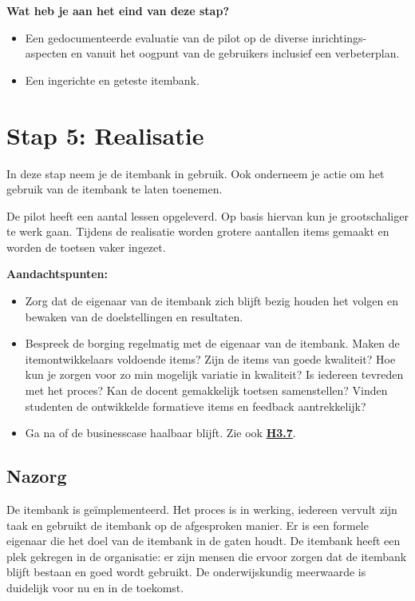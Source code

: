\documentclass[
]{book}
\providecommand{\tightlist}{%
  \setlength{\itemsep}{0pt}\setlength{\parskip}{0pt}}
\begin{document}
\textbf{Wat heb je aan het eind van deze stap?}

\begin{itemize}
\tightlist
\item
  Een gedocumenteerde evaluatie van de pilot op de diverse inrichtings- aspecten en vanuit het oogpunt van de gebruikers inclusief een verbeterplan.
\item
  Een ingerichte en geteste itembank.
\end{itemize}

\hypertarget{stap-5-realisatie}{%
\section{Stap 5: Realisatie}\label{stap-5-realisatie}}

In deze stap neem je de itembank in gebruik. Ook onderneem je actie om het gebruik van de itembank te laten toenemen.

De pilot heeft een aantal lessen opgeleverd. Op basis hiervan kun je grootschaliger te werk gaan. Tijdens de realisatie worden grotere aantallen items gemaakt en worden de toetsen vaker ingezet.

\textbf{Aandachtspunten:}

\begin{itemize}
\tightlist
\item
  Zorg dat de eigenaar van de itembank zich blijft bezig houden het volgen en bewaken van de doelstellingen en resultaten.
\item
  Bespreek de borging regelmatig met de eigenaar van de itembank. Maken de itemontwikkelaars voldoende items? Zijn de items van goede kwaliteit? Hoe kun je zorgen voor zo min mogelijk variatie in kwaliteit? Is iedereen tevreden met het proces? Kan de docent gemakkelijk toetsen samenstellen? Vinden studenten de ontwikkelde formatieve items en feedback aantrekkelijk?
\item
  Ga na of de businesscase haalbaar blijft. Zie ook \textbf{\protect\hyperlink{didactiek-kwaliteit-van-items}{H3.7}}.
\end{itemize}

\hypertarget{nazorg}{%
\subsection{Nazorg}\label{nazorg}}

De itembank is geïmplementeerd. Het proces is in werking, iedereen vervult zijn taak en gebruikt de itembank op de afgesproken manier. Er is een formele eigenaar die het doel van de itembank in de gaten houdt. De itembank heeft een plek gekregen in de organisatie: er zijn mensen die ervoor zorgen dat de itembank blijft bestaan en goed wordt gebruikt. De onderwijskundig meerwaarde is duidelijk voor nu en in de toekomst.
\end{document}
